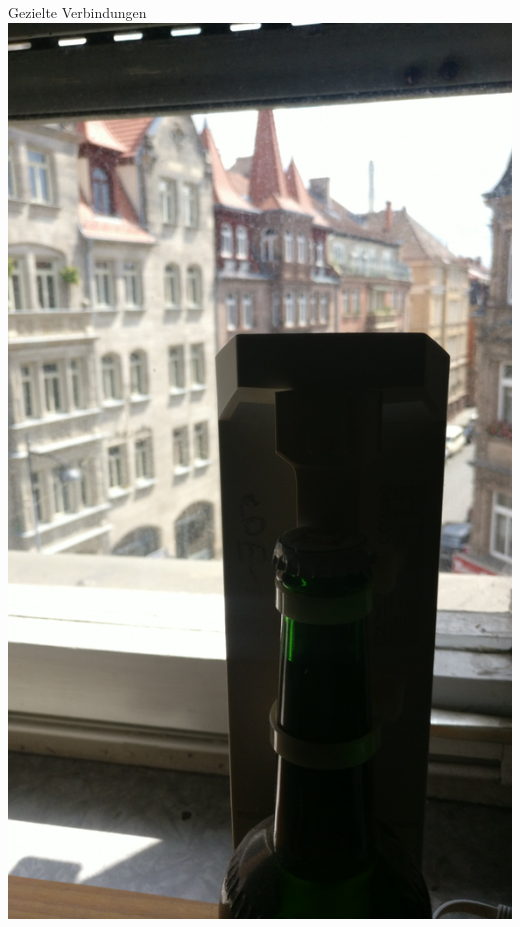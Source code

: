 \documentclass{beamer}
\begin{document}
	\begin{frame}[standout]{Gezielte Verbindungen}
		\includegraphics[height=0.9\textheight]{media/p2p-flasche2.jpg}
	\end{frame}
\end{document}

